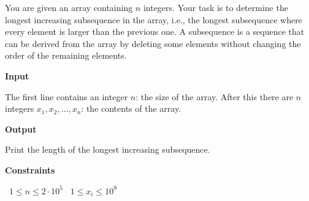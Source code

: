 You are given an array containing $n$ integers. Your task is to determine the longest increasing subsequence in the array, i.e., the longest subsequence where every element is larger than the previous one.
A subsequence is a sequence that can be derived from the array by deleting some elements without changing the order of the remaining elements.

\vspace{0.3cm}\noindent\textbf{Input}

The first line contains an integer $n$: the size of the array.
After this there are $n$ integers $x_1,x_2,\ldots,x_n$: the contents of the array.

\vspace{0.3cm}\noindent\textbf{Output}

Print the length of the longest increasing subsequence.

\vspace{0.3cm}\noindent\textbf{Constraints}

\textbullet\ $1 \le n \le 2 \cdot 10^5$
\textbullet\ $1 \le x_i \le 10^9$